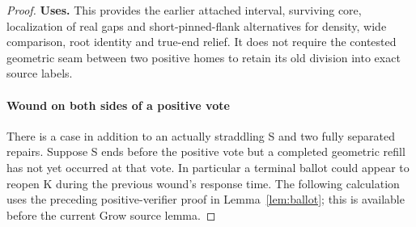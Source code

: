 \begin{proof}
\textbf{Uses.} This provides the earlier attached interval, surviving core, localization of real gaps and short-pinned-flank alternatives for density, wide comparison, root identity and true-end relief. It does not require the contested geometric seam between two positive homes to retain its old division into exact source labels.
\paragraph{Wound on both sides of a positive vote}

There is a case in addition to an actually straddling S and two fully separated repairs. Suppose S ends before the positive vote but a completed geometric refill has not yet occurred at that vote. In particular a terminal ballot could appear to reopen K during the previous wound's response time. The following calculation uses the preceding positive-verifier proof in Lemma~\ref{lem:ballot}; this is available before the current Grow source lemma.


\end{proof}
